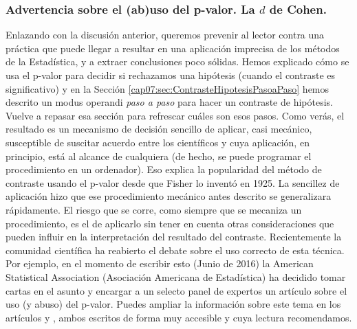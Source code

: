\subsubsection*{Advertencia sobre el (ab)uso del p-valor. La $d$ de Cohen.}
\label{cap07:subsubsec:AdvertenciaAbusoPValor}

Enlazando con la discusión anterior, queremos prevenir al lector contra una práctica que puede llegar a resultar en una aplicación imprecisa de los métodos de la Estadística, y a extraer conclusiones poco sólidas. Hemos explicado cómo se usa el p-valor para decidir si rechazamos una hipótesis (cuando el contraste es significativo) y en la Sección \ref{cap07:sec:ContrasteHipotesisPasoaPaso} hemos descrito un modus operandi {\em paso a paso} para hacer un contraste de hipótesis. Vuelve a repasar esa sección para refrescar cuáles son esos pasos. Como verás, el resultado es un mecanismo de decisión sencillo de aplicar, casi mecánico, susceptible de suscitar acuerdo entre los científicos y cuya aplicación, en principio, está al alcance de cualquiera (de hecho, se puede programar el procedimiento en un ordenador). Eso explica la popularidad del método de contraste usando el p-valor desde que Fisher lo inventó en 1925. La sencillez de aplicación hizo que ese procedimiento mecánico antes descrito se generalizara rápidamente. El riesgo que se corre, como siempre que se mecaniza un procedimiento, es el de aplicarlo sin tener en cuenta otras consideraciones que pueden influir en la interpretación del resultado del contraste.  Recientemente la comunidad científica ha reabierto el debate sobre el uso correcto de esta técnica. Por ejemplo, en el momento de escribir esto (Junio de 2016) la American Statistical Association (Asociación Americana de Estadística) ha decidido tomar cartas en el asunto y encargar a un selecto panel de expertos un artículo sobre el uso (y abuso) del p-valor. Puedes ampliar la información sobre este tema en los artículos  \cite{wasserstein2016asa} y \cite{nuzzo2014statistical}, ambos escritos de forma muy accesible  y cuya lectura recomendamos.


